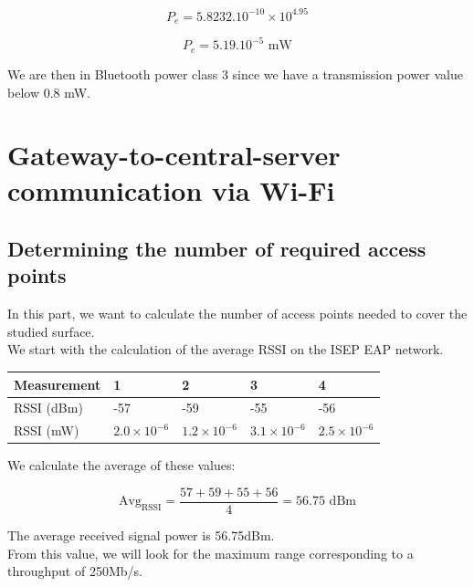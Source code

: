 \documentclass[12]{article}
\begin{document}
\begin{equation*}
    P_{e} = 5.8232.10^{-10} \times 10^{4.95}
\end{equation*}

\begin{equation*}
    P_{e} = 5.19.10^{-5} \text{ mW}
\end{equation*}

We are then in Bluetooth power class 3 since we have a transmission power value below 0.8 mW.

\section{Gateway-to-central-server communication via Wi-Fi}

\subsection{Determining the number of required access points}

In this part, we want to calculate the number of access points needed to cover the studied surface. \\

We start with the calculation of the average RSSI on the ISEP EAP network.

\begin{table}[H]
\centering
\begin{tabular}{|l|l|l|l|l|}
\hline
\rowcolor[HTML]{000000}
{\color[HTML]{FFFFFF} Measurement} & {\color[HTML]{FFFFFF} 1} & {\color[HTML]{FFFFFF} 2} & {\color[HTML]{FFFFFF} 3} & {\color[HTML]{FFFFFF} 4} \\ \hline
RSSI (dBm) & -57 & -59 & -55 & -56 \\ \hline
RSSI (mW) & $2.0 \times 10^{-6}$ & $1.2 \times 10^{-6}$ & $3.1 \times 10^{-6}$ & $2.5 \times 10^{-6}$ \\ \hline
\end{tabular}
\end{table}

We calculate the average of these values:

\begin{equation*}
\text{Avg}_\text{RSSI} = \frac{57 + 59 + 55 + 56}{4} = 56.75\text{ dBm}
\end{equation*}

The average received signal power is 56.75dBm. \\

From this value, we will look for the maximum range corresponding to a throughput of 250Mb/s.
\end{document}
